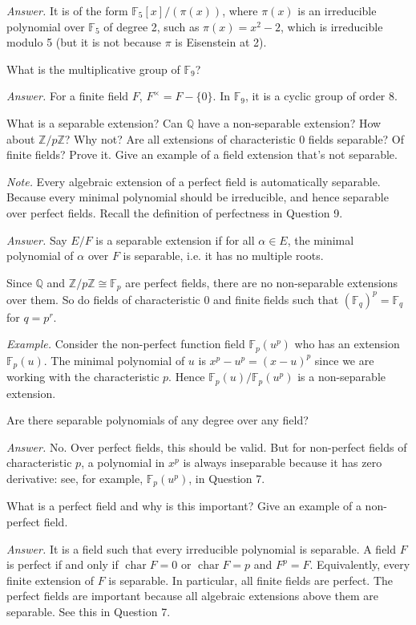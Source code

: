 \documentclass{mathproblems}
\newcommand\Q{\mathbb{Q}}
\newcommand\Z{\mathbb{Z}}
\newcommand\F{\mathbb{F}}
\begin{document}
\begin{questions}
\textit{Answer.}
It is of the form $\F_5[x]/(\pi(x))$, where $\pi(x)$ is an irreducible polynomial over $\F_5$ of degree 2, such as $\pi(x)=x^2-2$, which is irreducible modulo 5 (but it is not because $\pi$ is Eisenstein at 2).

\miquestion
{\color{blue} What is the multiplicative group of $\F_{9}$?}

\textit{Answer.}
For a finite field $F$, $F^\times=F-\{0\}$. In $\F_9$, it is a cyclic group of order $8$.

\miquestion
{\color{blue} What is a separable extension? Can $\Q$ have a non-separable extension? How about $\Z / p \Z$? Why not? Are all extensions of characteristic 0 fields separable? Of finite fields? Prove it. Give an example of a field extension that's not separable.}

{\color{violet} \textit{Note.} Every algebraic extension of a perfect field is automatically separable. Because every minimal polynomial should be irreducible, and hence separable over perfect fields. Recall the definition of perfectness in Question 9.}

\textit{Answer.} Say $E/F$ is a separable extension if for all $\alpha\in E$, the minimal polynomial of $\alpha$ over $F$ is separable, i.e. it has no multiple roots.

Since $\Q$ and $\Z/p\Z\cong \F_p$ are perfect fields, there are no non-separable extensions over them. So do fields of characteristic 0 and finite fields such that $(\F_q)^p=\F_q$ for $q=p^r$.

\textit{Example.} Consider the non-perfect function field $\F_p(u^p)$ who has an extension $\F_p(u)$. The minimal polynomial of $u$ is $x^p-u^p=(x-u)^p$ since we are working with the characteristic $p$. Hence $\F_p(u)/\F_p(u^p)$ is a non-separable extension.

\miquestion
{\color{blue} Are there separable polynomials of any degree over any field?}

\textit{Answer.} No. Over perfect fields, this should be valid. But for non-perfect fields of characteristic $p$, a polynomial in $x^p$ is always inseparable because it has zero derivative: see, for example, $\F_p(u^p)$, in Question 7.

\miquestion
{\color{blue} What is a perfect field and why is this important? Give an example of a non-perfect field.}

\textit{Answer.}
It is a field such that every irreducible polynomial is separable. A field $F$ is perfect if and only if $\operatorname{char} F=0$ or $\operatorname{char} F=p$ and $F^p=F$. Equivalently, every finite extension of $F$ is separable. In particular, all finite fields are perfect. The perfect fields are important because all algebraic extensions above them are separable. See this in Question 7.


\end{questions}
\end{document}
